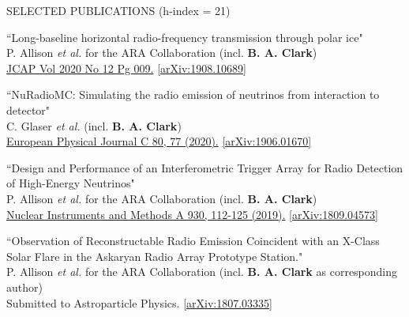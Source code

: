 \documentclass{resume} %
\begin{document}
\begin{rSection}{SELECTED PUBLICATIONS (h-index = 21)}
\begin{etaremune}
  \item ``Long-baseline horizontal radio-frequency transmission through polar ice" \\
 P. Allison {\it et al.} for the ARA Collaboration (incl. \textbf{B. A. Clark})\\    \href{https://iopscience.iop.org/article/10.1088/1475-7516/2020/12/009}{JCAP Vol 2020 No 12 Pg 009.} \href{https://arxiv.org/abs/1908.10689}{[arXiv:1908.10689]}

  \item ``NuRadioMC: Simulating the radio emission of neutrinos from interaction to detector" \\
 C. Glaser {\it et al.} (incl. \textbf{B. A. Clark})\\     \href{https://doi.org/10.1140/epjc/s10052-020-7612-8}{European Physical Journal C 80, 77 (2020).} \href{https://arxiv.org/abs/1906.01670}{[arXiv:1906.01670]}
 

  \item ``Design and Performance of an Interferometric Trigger Array for Radio Detection of High-Energy Neutrinos" \\
 P. Allison {\it et al.} for the ARA Collaboration (incl. \textbf{B. A. Clark}) \\    \href{https://doi.org/10.1016/j.nima.2019.01.067}{Nuclear Instruments and Methods A 930, 112-125 (2019).}  \href{https://arxiv.org/abs/1809.04573}{[arXiv:1809.04573]}
 

 \item ``Observation of Reconstructable Radio Emission Coincident with an X-Class Solar Flare in the Askaryan Radio Array Prototype Station." \\
P. Allison {\it et al.} for the ARA Collaboration (incl. \textbf{B. A. Clark} as corresponding author) \\
 Submitted to Astroparticle Physics. \href{https://arxiv.org/abs/1807.03335}{[arXiv:1807.03335]}
 


\end{etaremune}
\end{rSection}
\end{document}
